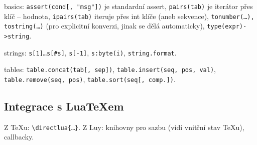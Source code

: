 \documentclass[12pt]{article}					%
\begin{document}
        \begin{definice}[Knihovny]
            basics: \verb|assert(cond[, "msg"])| je standardní assert, \verb|pairs(tab)| je iterátor přes klíč -- hodnota, \verb|ipairs(tab)| iteruje přes int klíče (aneb sekvence), \verb|tonumber(…), tostring(…)| (pro explicitní konverzi, jinak se dělá automaticky), \verb|type(expr)->string|.

            strings: \verb|s[1]…s[#s]|, \verb|s[-1]|, \verb|s:byte(i)|, \verb|string.format|.

            tables: \verb|table.concat(tab[, sep])|, \verb|table.insert(seq, pos, val)|, \verb|table.remove(seq, pos)|, \verb|table.sort(seq[, comp.])|.
        \end{definice}

    \subsection{Integrace s LuaTeXem}
        \begin{poznamka}
            Z TeXu: \verb|\directlua{…}|. Z Luy: knihovny pro sazbu (vidí vnitřní stav TeXu), callbacky.
        \end{poznamka}
\end{document}
